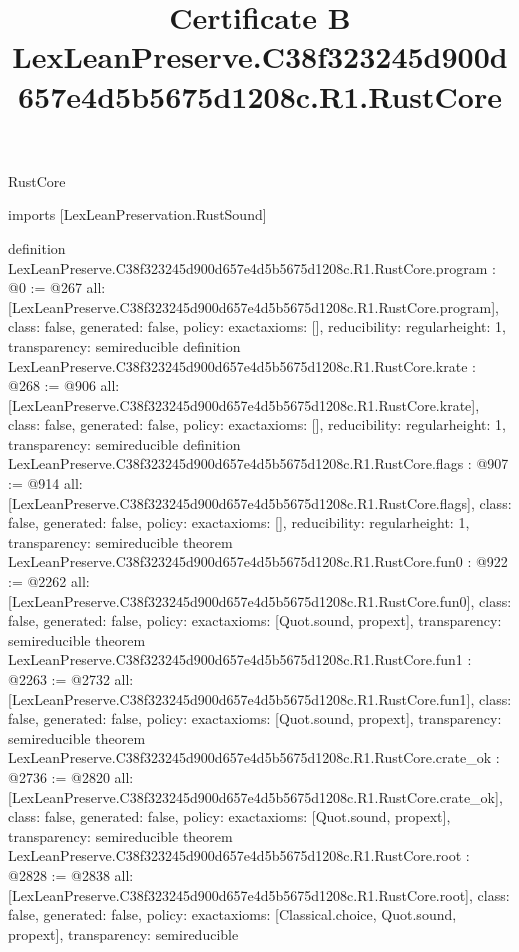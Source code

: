 \begin{lexlean}{RustCore}
\title{Certificate B LexLeanPreserve.C38f323245d900d657e4d5b5675d1208c.R1.RustCore}
\begin{coremodule}
imports [LexLeanPreservation.RustSound]

definition LexLeanPreserve.C38f323245d900d657e4d5b5675d1208c.R1.RustCore.program : @0 := @267 {
  all: [LexLeanPreserve.C38f323245d900d657e4d5b5675d1208c.R1.RustCore.program],
  class: false,
  generated: false,
  policy: exact{axioms: []},
  reducibility: regular{height: 1},
  transparency: semireducible
}
definition LexLeanPreserve.C38f323245d900d657e4d5b5675d1208c.R1.RustCore.krate : @268 := @906 {
  all: [LexLeanPreserve.C38f323245d900d657e4d5b5675d1208c.R1.RustCore.krate],
  class: false,
  generated: false,
  policy: exact{axioms: []},
  reducibility: regular{height: 1},
  transparency: semireducible
}
definition LexLeanPreserve.C38f323245d900d657e4d5b5675d1208c.R1.RustCore.flags : @907 := @914 {
  all: [LexLeanPreserve.C38f323245d900d657e4d5b5675d1208c.R1.RustCore.flags],
  class: false,
  generated: false,
  policy: exact{axioms: []},
  reducibility: regular{height: 1},
  transparency: semireducible
}
theorem LexLeanPreserve.C38f323245d900d657e4d5b5675d1208c.R1.RustCore.fun0 : @922 := @2262 {
  all: [LexLeanPreserve.C38f323245d900d657e4d5b5675d1208c.R1.RustCore.fun0],
  class: false,
  generated: false,
  policy: exact{axioms: [Quot.sound, propext]},
  transparency: semireducible
}
theorem LexLeanPreserve.C38f323245d900d657e4d5b5675d1208c.R1.RustCore.fun1 : @2263 := @2732 {
  all: [LexLeanPreserve.C38f323245d900d657e4d5b5675d1208c.R1.RustCore.fun1],
  class: false,
  generated: false,
  policy: exact{axioms: [Quot.sound, propext]},
  transparency: semireducible
}
theorem LexLeanPreserve.C38f323245d900d657e4d5b5675d1208c.R1.RustCore.crate_ok : @2736 := @2820 {
  all: [LexLeanPreserve.C38f323245d900d657e4d5b5675d1208c.R1.RustCore.crate_ok],
  class: false,
  generated: false,
  policy: exact{axioms: [Quot.sound, propext]},
  transparency: semireducible
}
theorem LexLeanPreserve.C38f323245d900d657e4d5b5675d1208c.R1.RustCore.root : @2828 := @2838 {
  all: [LexLeanPreserve.C38f323245d900d657e4d5b5675d1208c.R1.RustCore.root],
  class: false,
  generated: false,
  policy: exact{axioms: [Classical.choice, Quot.sound, propext]},
  transparency: semireducible
}


\end{coremodule}
\end{lexlean}
